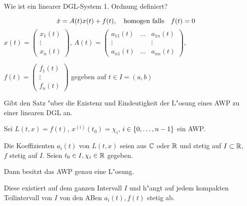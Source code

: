 \documentclass[9pt]{article}
\newcommand{\R}[1]{%
	\ifthenelse{\equal{#1}{}}
	{\mathbb{R}}
	{\mathbb{R}^{#1}}}%
\newcommand{\C}[1]{%
	\ifthenelse{\equal{#1}{}}
	{\mathbb{C}}
	{\mathbb{C}^{#1}}}%
\newenvironment{field}{}{\newpage}
\newif\ifnote
\newenvironment{note}{\notetrue}{\notefalse}
\newcommand{\localtag}{}
\newcommand{\globaltag}{}
\newcommand{\uuid}{}
\newcommand{\tags}[1]{
    \ifnote 
        \renewcommand{\localtag}{#1}
    \else
        \renewcommand{\globaltag}{#1}
    \fi 
    }
\newcommand{\xplain}[1]{\renewcommand{\uuid}{#1}}
\begin{document}
\begin{note}
	\xplain{006d7d21-f93d-4cbe-8c80-77702a0f32ee}
	\tags{definition, satz LDGL, 3.7}
	
	\begin{field}  %
		Wie ist ein linearer DGL-System 1. Ordnung definiert?
	\end{field}
	
	\begin{field}  %
		\begin{equation*}
		\dot{x} = A(t)x(t) + f(t), \qq{homogen falls} f(t) =0
		\end{equation*}
		\footnotesize
		$x(t) = \begin{pmatrix}x_1(t) \\ \vdots \\ x_n(t) \end{pmatrix}$, \quad $A(t)=
			\begin{pmatrix}
				a_{11}(t) & \dots & a_{1n}(t) \\
				\vdots    &       & \vdots \\
				a_{n1}(t) & \dots & a_{nn}(t) 
			\end{pmatrix}$,
		
		
		$f(t) = 
			\begin{pmatrix}
				f_1(t) \\ \vdots \\ f_n(t)
			\end{pmatrix}$
		gegeben auf $t\in I = (a,b)$
	\end{field}
		
	\begin{field}  %
		Gibt den Satz "uber die
		Existenz und Eindeutigkeit der L"osung eines AWP zu einer linearen DGL an.
	\end{field}
	
	\begin{field}  %
		Sei $L(t,x)=f(t)$, $x^{(i)}(t_0) = \chi_i$, $i \in \qty{0,\dots, n-1}$ ein AWP.
		
		Die Koeffizienten $a_i(t)$ von $L(t,x)$ seien aus $\C{}$ oder $\R{}$ und stetig auf $I \subset \R{}$, $f$ stetig auf $I$. Seien $t_0\in I, \chi_i \in \R{}$  gegeben.
		
		 Dann besitzt das AWP genau eine L"osung.
		 
		 Diese existiert auf dem ganzen Intervall $I$ und h"angt auf jedem kompakten Teilintervall von $I$ von den ABen $a_i(t),f(t)$ stetig ab.
	\end{field}
\end{note}
\end{document}
